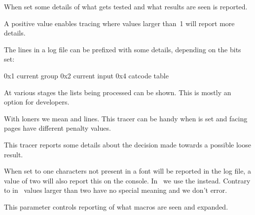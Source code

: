 \startoldprimitive[title={\prm {tracingifs}}]

When set some details of what gets tested and what results are seen is reported.

\stopoldprimitive

\startnewprimitive[title={\prm {tracinginserts}}]

A positive value enables tracing where values larger than~1 will report more
details.

\stopnewprimitive

\startnewprimitive[title={\prm {tracinglevels}}]

The lines in a log file can be prefixed with some details, depending on the bits
set:

\starttabulate[|T|l|]
\NC 0x1 \NC current group \NC \NR
\NC 0x2 \NC current input \NC \NR
\NC 0x4 \NC catcode table \NC \NR
\stoptabulate

\stopnewprimitive

\startnewprimitive[title={\prm {tracinglists}}]

At various stages the lists being processed can be shown. This is mostly an
option for developers.

\stopnewprimitive

\startnewprimitive[title={\prm {tracingloners}}]

With loners we mean  and  lines. This tracer can be
handy when  is set and facing pages have different
penalty values.

\stopnewprimitive

\startnewprimitive[title={\prm {tracinglooseness}}]

This tracer reports some details about the decision made towards a possible
loose result.

\stopnewprimitive

\startoldprimitive[title={\prm {tracinglostchars}}]

When set to one characters not present in a font will be reported in the log
file, a value of two will also report this on the console. In \CONTEXT\ we use
the  instead. Contrary to in \LUATEX\ values larger than
two have no special meaning and we don't error.

\stopoldprimitive

\startoldprimitive[title={\prm {tracingmacros}}]

This parameter controls reporting of what macros are seen and expanded.


